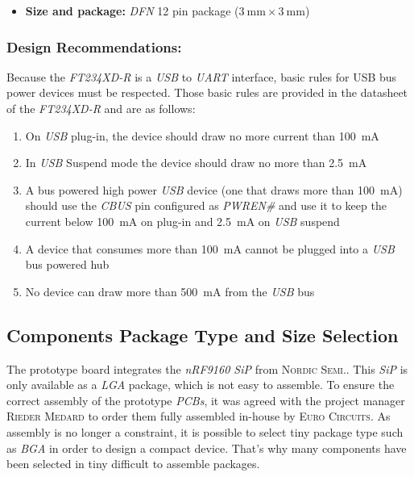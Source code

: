 \documentclass[report.tex]{subfiles}
\begin{document}
\begin{itemize}
\begin{itemize}
\begin{itemize}
\item bus-powered
\item self-powered
\item bus-powered with power switching
\end{itemize} 
\item Integrated \SI{+3.3}{\volt} level converter for \textit{USB I/O}
\item Integrated \textit{power-on-reset} circuit
\end{itemize}
\item \textbf{Size and package:} \textit{DFN} 12 pin package ($\SI{3}{\milli\meter} \times \SI{3}{\milli\meter}$) 
\end{itemize}

\pagebreak


\subsubsection{Design Recommendations:} \label{sec:ftdi_sel}

Because the \textit{FT234XD-R} is a \textit{USB} to \textit{UART} interface, basic rules for USB bus  power devices must be respected. Those basic rules are provided in the datasheet of the \textit{FT234XD-R}\cite{FTDIUSB} and are as follows:

\begin{enumerate}
\item On \textit{USB} plug-in, the device should draw no more current than \SI{100}{\milli\ampere}
\item In \textit{USB} Suspend mode the device should draw no more than \SI{2.5}{\milli\ampere}
\item A bus powered high power \textit{USB} device (one that draws more than \SI{100}{\milli\ampere}) should use the \textit{CBUS} pin configured as \textit{PWREN\#} and use it to keep the current below \SI{100}{\milli\ampere} on plug-in and \SI{2.5}{\milli\ampere} on \textit{USB} suspend
\item A device that consumes more than \SI{100}{\milli\ampere} cannot be plugged into a \textit{USB} bus powered hub
\item No device can draw more than \SI{500}{\milli\ampere} from the \textit{USB} bus
\end{enumerate}

\subsection{Components Package Type and Size Selection} \label{sec:comp_size_select}
The prototype board integrates the \textit{nRF9160 SiP} from \textsc{Nordic Semi.}. This \textit{SiP} is only available as a \textit{LGA} package, which is not easy to assemble. To ensure the correct assembly of the prototype \textit{PCBs}, it was agreed with the project manager \textsc{Rieder Medard} to order them fully assembled in-house by \textsc{Euro Circuits}. As assembly is no longer a constraint, it is possible to select tiny package type such as \textit{BGA}  in order to design a compact device. That's why many components have been selected in tiny difficult to assemble packages.\\
\end{document}
